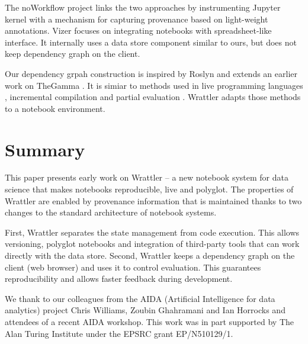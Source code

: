 \documentclass[sigplan]{acmart}\settopmatter{printfolios=true,printccs=false,printacmref=false}
\begin{document}
The noWorkflow project \cite{noworkflow} links the two approaches by instrumenting Jupyter 
kernel with a mechanism for capturing provenance based on light-weight annotations.
Vizer \cite{vizer} focuses on integrating notebooks with spreadsheet-like interface.
It internally uses a data store component similar to ours, but does not keep dependency graph
on the client.

Our dependency grpah construction is inspired by Roslyn \cite{roslyn} and extends an
earlier work on TheGamma \cite{livegamma}. It is simiar to methods used in live programming 
languages \cite{live,subtext}, incremental compilation \cite{incremental} and
partial evaluation \cite{partial}. Wrattler adapts those methods to a notebook environment. 

\section{Summary}

This paper presents early work on Wrattler -- a new notebook system for data science that makes
notebooks reproducible, live and polyglot. The properties of Wrattler are enabled by provenance
information that is maintained thanks to two changes to the standard architecture of notebook 
systems. 

First, Wrattler separates the state management from code execution. This allows versioning,
polyglot notebooks and integration of third-party tools that can work directly with
the data store. Second, Wrattler keeps a dependency graph on the client (web browser) and uses 
it to control evaluation. This guarantees reproducibility and allows faster feedback during
development.

\begin{acks}
We thank to our colleagues from the AIDA (Artificial Intelligence for data analytics) project
Chris Williams, Zoubin Ghahramani and Ian Horrocks and attendees of a recent 
AIDA workshop. This work was in part supported by The Alan Turing 
Institute under the EPSRC grant EP/N510129/1.
\end{acks}


\end{document}
